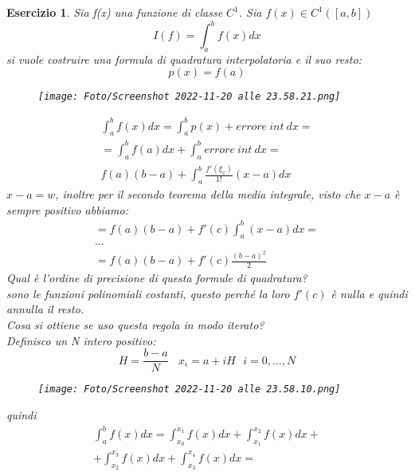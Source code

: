 \documentclass[a4paper, portrait]{book}
\numberwithin{equation}{chapter} %
\newtheorem{exercize}{Esercizio}
\begin{document}
\begin{exercize}
    Sia f(x) una funzione di classe $C^1$. Sia $f(x) \in C^1 ([a,b])$
    \begin{equation}
        I(f) = \int_a^b f(x) dx
    \end{equation}
    si vuole costruire una formula di quadratura interpolatoria e il suo resto:
    \begin{equation}
        p(x) = f(a)
    \end{equation}
    \begin{figure}[h!]
        \centering
        \texttt{[image: Foto/Screenshot 2022-11-20 alle 23.58.21.png]}
        \caption{}
    \end{figure}
    \begin{gather}
        \int_a^b f(x) dx = \int_a^b p(x) + errore \ int \ dx = \\
        = \int_a^b f(a) dx + \int_a^b errore \ int \ dx = \\
        f(a)(b-a) + \int_a^b \frac{f'(\xi_x)}{1!}(x-a) dx
    \end{gather}
    $x-a = w$, inoltre per il secondo teorema della media integrale, visto che $x-a$ è sempre positivo abbiamo:
    \begin{gather}
        = f(a) (b-a) + f'(c) \int_a^b (x-a) dx = \\
        ...\\
        = f(a) (b-a) + f'(c) \frac{(b-a)^2}{2}
    \end{gather}
    Qual è l'ordine di precisione di questa formule di quadratura?\\
    sono le funzioni polinomiali costanti, questo perché la loro $f'(c)$ è nulla e quindi annulla il resto.\\
    Cosa si ottiene se uso questa regola in modo iterato?\\
    Definisco un N intero positivo:
    \begin{equation}
        H = \frac{b-a}{N} \ \ \ \ x_i = a+iH \ \ \ i = 0,...,N
    \end{equation}
    \begin{figure}[h!]
        \centering
        \texttt{[image: Foto/Screenshot 2022-11-20 alle 23.58.10.png]}
        \caption{}
    \end{figure}
    quindi
    \begin{gather}
        \int_a^b f(x) dx = \int_{x_0}^{x_1} f(x) dx + \int_{x_1}^{x_2} f(x) dx + \\
        + \int_{x_2}^{x_3} f(x) dx + \int_{x_3}^{x_4}f(x) dx = \\

\end{gather}
\end{exercize}
\end{document}
